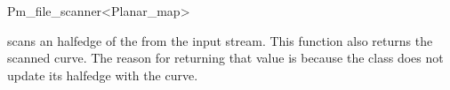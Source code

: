 \begin{ccRefClass}{Pm_file_scanner<Planar_map>}

{scans an halfedge of the  from the input stream. 
This function also returns the scanned curve. 
The reason for returning that value is because the  class  
does not update its halfedge with the curve.}


\end{ccRefClass} %

\ccRefPageEnd











